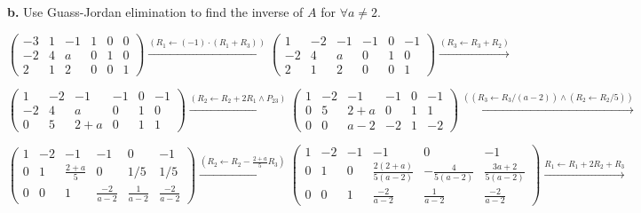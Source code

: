 \documentclass{article}
\begin{document}
\textbf{b.} Use Guass-Jordan elimination to find the inverse of $A$ for $\forall a \ne 2$.

\begin{equation*}
  \begin{pmatrix}
    -3 & 1 & -1 & 1 & 0 & 0 \\
    -2 & 4 &  a & 0 & 1 & 0 \\
     2 & 1 &  2 & 0 & 0 & 1 
   \end{pmatrix}
   \xrightarrow{(R_{1} \leftarrow (-1) \cdot (R_{1} + R_{3}))}
  \begin{pmatrix}
    1 & -2 & -1 & -1 & 0 & -1 \\
    -2 & 4 &  a & 0 & 1 & 0 \\
     2 & 1 &  2 & 0 & 0 & 1 
   \end{pmatrix}
   \xrightarrow{(R_{3} \leftarrow R_{3} + R_{2})}
 \end{equation*}
 
\begin{equation*}
  \begin{pmatrix}
    1 & -2 & -1 & -1 & 0 & -1 \\
    -2 & 4 &  a & 0 & 1 & 0 \\
     0 & 5 &  2 + a & 0 & 1 & 1
  \end{pmatrix}
  \xrightarrow{(R_{2} \leftarrow R_{2} + 2R_{1} \land P_{23})}
  \begin{pmatrix}
    1 & -2 & -1 & -1 & 0 & -1 \\
   0 & 5 &  2 + a & 0 & 1 & 1 \\
    0 & 0 &  a - 2 & -2 & 1 & -2 
  \end{pmatrix}
  \xrightarrow{((R_{3} \leftarrow R_{3} / (a-2)) \land (R_{2} \leftarrow R_{2} / 5))}
\end{equation*}

\begin{equation*}
  \begin{pmatrix}
    1 & -2 & -1 & -1 & 0 & -1 \\
    0 & 1 &  \frac{2 + a}{5} & 0 & 1/5 & 1/5 \\
    0 & 0 &  1 & \frac{-2}{a-2} & \frac{1}{a-2} & \frac{-2}{a-2} 
  \end{pmatrix}
  \xrightarrow{(R_{2} \leftarrow R_{2} - \frac{2+a}{5} R_{3})}
  \begin{pmatrix}
    1 & -2 & -1 & -1 & 0 & -1 \\
    0 & 1 &  0 & \frac{2(2+a)}{5(a-2)} & -\frac{4}{5(a-2)} & \frac{3a+2}{5(a-2)} \\
    0 & 0 &  1 & \frac{-2}{a-2} & \frac{1}{a-2} & \frac{-2}{a-2} 
  \end{pmatrix}
  \xrightarrow{ R_{1} \leftarrow R_{1} + 2R_{2} + R_{3} }
\end{equation*}
\end{document}
